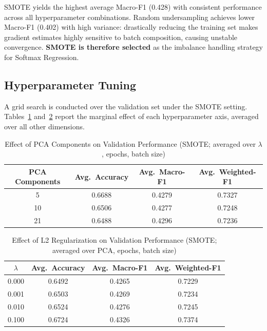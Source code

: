 \documentclass[12pt,a4paper]{article}
\begin{document}
SMOTE yields the highest average Macro-F1 (0.428) with consistent performance across all hyperparameter combinations. Random undersampling achieves lower Macro-F1 (0.402) with high variance: drastically reducing the training set makes gradient estimates highly sensitive to batch composition, causing unstable convergence. \textbf{SMOTE is therefore selected} as the imbalance handling strategy for Softmax Regression.

\subsection{Hyperparameter Tuning}
\label{sec:softmax_tuning}

A grid search is conducted over the validation set under the SMOTE setting. Tables~\ref{tab:softmax_pca_effect} and~\ref{tab:softmax_l2_effect} report the marginal effect of each hyperparameter axis, averaged over all other dimensions.

\begin{table}[H]
    \centering
    \caption{Effect of PCA Components on Validation Performance (SMOTE; averaged over $\lambda$, epochs, batch size)}
    \label{tab:softmax_pca_effect}
    \begin{tabular}{cccc}
        \toprule
        \textbf{PCA Components} & \textbf{Avg.\ Accuracy} & \textbf{Avg.\ Macro-F1} & \textbf{Avg.\ Weighted-F1} \\
        \midrule
        5  & 0.6688 & 0.4279 & 0.7327 \\
        10 & 0.6506 & 0.4277 & 0.7248 \\
        21 & 0.6488 & 0.4296 & 0.7236 \\
        \bottomrule
    \end{tabular}
\end{table}

\begin{table}[H]
    \centering
    \caption{Effect of L2 Regularization on Validation Performance (SMOTE; averaged over PCA, epochs, batch size)}
    \label{tab:softmax_l2_effect}
    \begin{tabular}{cccc}
        \toprule
        $\lambda$ & \textbf{Avg.\ Accuracy} & \textbf{Avg.\ Macro-F1} & \textbf{Avg.\ Weighted-F1} \\
        \midrule
        0.000 & 0.6492 & 0.4265 & 0.7229 \\
        0.001 & 0.6503 & 0.4269 & 0.7234 \\
        0.010 & 0.6524 & 0.4276 & 0.7245 \\
        0.100 & 0.6724 & 0.4326 & 0.7374 \\
        \bottomrule
    \end{tabular}
\end{table}
\end{document}
